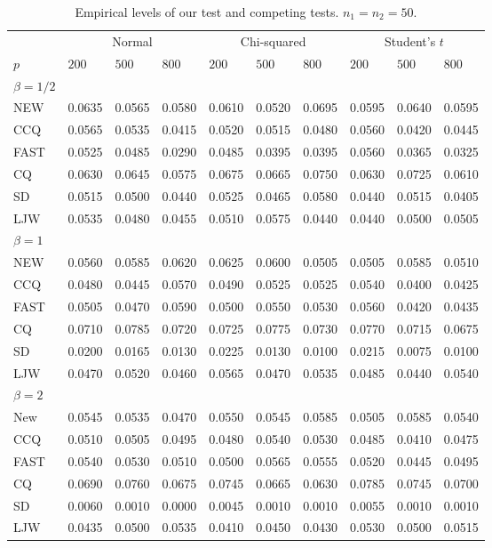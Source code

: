 \documentclass[3p]{elsarticle}
\theoremstyle{plain}
\theoremstyle{definition}
\theoremstyle{remark}
\begin{document}
\begin{table}[ht]
\caption{Empirical levels of our test and competing tests. $n_1=n_2=50$.} 
\label{hahaha1}
\vspace{3mm}
\centering
\begin{tabular}{llllllllll}
\toprule
    &   \multicolumn{3}{c}{Normal} & \multicolumn{3}{c}{Chi-squared}& \multicolumn{3}{c}{Student's $t$}  \\
    \cmidrule(r){2-4}
\cmidrule(r){5-7}
\cmidrule(r){8-10}
    $p$ & $200$ &  $500$ & $800$ & $200$  & $500$ & $800$ & $200$ & $500$ & $800$ \\ 
\midrule
    $\beta=1/2$\\
NEW & 0.0635 & 0.0565 & 0.0580 & 0.0610 & 0.0520 & 0.0695 & 0.0595 & 0.0640 & 0.0595 \\ 
CCQ & 0.0565 & 0.0535 & 0.0415 & 0.0520 & 0.0515 & 0.0480 & 0.0560 & 0.0420 & 0.0445 \\ 
FAST & 0.0525 & 0.0485 & 0.0290 & 0.0485 & 0.0395 & 0.0395 & 0.0560 & 0.0365 & 0.0325 \\ 
CQ & 0.0630 & 0.0645 & 0.0575 & 0.0675 & 0.0665 & 0.0750 & 0.0630 & 0.0725 & 0.0610 \\ 
SD & 0.0515 & 0.0500 & 0.0440 & 0.0525 & 0.0465 & 0.0580 & 0.0440 & 0.0515 & 0.0405 \\ 
LJW & 0.0535 & 0.0480 & 0.0455 & 0.0510 & 0.0575 & 0.0440 & 0.0440 & 0.0500 & 0.0505 \\ 
    $\beta=1$\\
NEW & 0.0560 & 0.0585 & 0.0620 & 0.0625 & 0.0600 & 0.0505 & 0.0505 & 0.0585 & 0.0510 \\ 
CCQ & 0.0480 & 0.0445 & 0.0570 & 0.0490 & 0.0525 & 0.0525 & 0.0540 & 0.0400 & 0.0425 \\ 
FAST & 0.0505 & 0.0470 & 0.0590 & 0.0500 & 0.0550 & 0.0530 & 0.0560 & 0.0420 & 0.0435 \\ 
CQ & 0.0710 & 0.0785 & 0.0720 & 0.0725 & 0.0775 & 0.0730 & 0.0770 & 0.0715 & 0.0675 \\ 
SD & 0.0200 & 0.0165 & 0.0130 & 0.0225 & 0.0130 & 0.0100 & 0.0215 & 0.0075 & 0.0100 \\ 
LJW & 0.0470 & 0.0520 & 0.0460 & 0.0565 & 0.0470 & 0.0535 & 0.0485 & 0.0440 & 0.0540 \\ 
    $\beta=2$\\
New & 0.0545 & 0.0535 & 0.0470 & 0.0550 & 0.0545 & 0.0585 & 0.0505 & 0.0585 & 0.0540 \\ 
CCQ & 0.0510 & 0.0505 & 0.0495 & 0.0480 & 0.0540 & 0.0530 & 0.0485 & 0.0410 & 0.0475 \\ 
FAST & 0.0540 & 0.0530 & 0.0510 & 0.0500 & 0.0565 & 0.0555 & 0.0520 & 0.0445 & 0.0495 \\ 
CQ & 0.0690 & 0.0760 & 0.0675 & 0.0745 & 0.0665 & 0.0630 & 0.0785 & 0.0745 & 0.0700 \\ 
SD & 0.0060 & 0.0010 & 0.0000 & 0.0045 & 0.0010 & 0.0010 & 0.0055 & 0.0010 & 0.0010 \\ 
LJW & 0.0435 & 0.0500 & 0.0535 & 0.0410 & 0.0450 & 0.0430 & 0.0530 & 0.0500 & 0.0515 \\ 
\bottomrule
\end{tabular}
\end{table}
\end{document}
